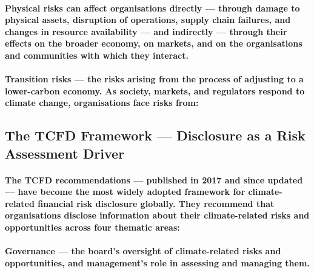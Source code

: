 \paragraph{Physical risks can affect organisations directly — through damage to physical assets, disruption of operations, supply chain failures, and changes in resource availability — and indirectly — through their effects on the broader economy, on markets, and on the organisations and communities with which they interact.}
\paragraph{\textbf{Transition risks} — the risks arising from the process of adjusting to a lower-carbon economy. As society, markets, and regulators respond to climate change, organisations face risks from:}
\begin{itemize}
\end{itemize}

\subsection{The TCFD Framework — Disclosure as a Risk Assessment Driver}
\paragraph{The TCFD recommendations — published in 2017 and since updated — have become the most widely adopted framework for climate-related financial risk disclosure globally. They recommend that organisations disclose information about their climate-related risks and opportunities across four thematic areas:}
\paragraph{\textbf{Governance} — the board's oversight of climate-related risks and opportunities, and management's role in assessing and managing them.}
